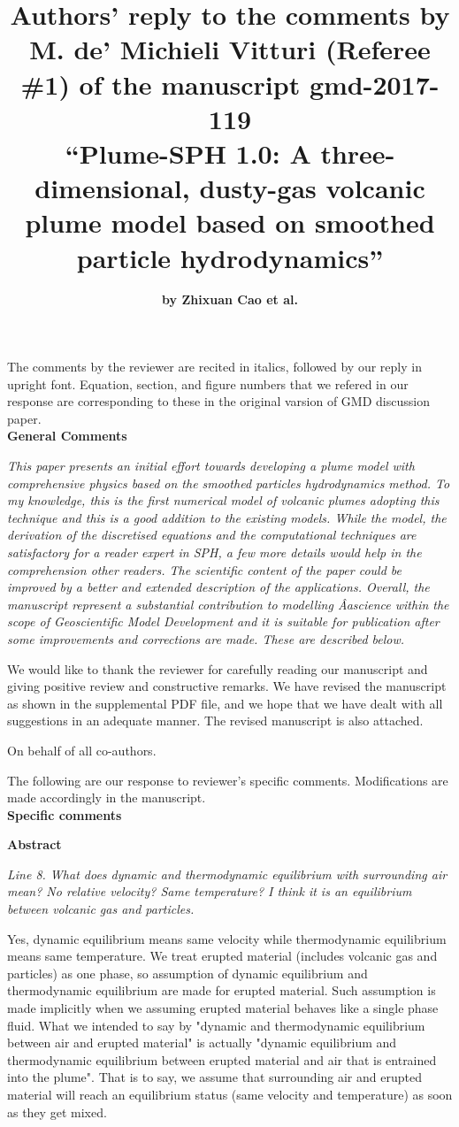 \documentclass[10pt,a4paper]{article}
\author{\Large \textbf{by Zhixuan Cao et al.}}
\title{ \Large{ Authors' reply to the comments by M. de’ Michieli Vitturi (Referee \#1) of the manuscript gmd-2017-119} \\
\LARGE \textbf{“Plume-SPH 1.0: A three-dimensional, dusty-gas volcanic plume model based on smoothed particle hydrodynamics”}}
\date{\vspace{-5ex}}
\begin{document}
\maketitle
The comments by the reviewer are recited in italics, followed by our reply in upright font. Equation, section, and figure numbers that we refered in our response are corresponding to these in the original varsion of GMD discussion paper. \\[12pt]

\textbf{\large General Comments}

\textit{This paper presents an initial effort towards developing a plume model with comprehensive physics based on the smoothed particles hydrodynamics method. To my knowledge, this is the first numerical model of volcanic plumes adopting this technique and this is a good addition to the existing models. While the model, the derivation of the discretised equations and the computational techniques are satisfactory for a reader expert in SPH, a few more details would help in the comprehension other readers. The scientific content of the paper could be improved by a better and extended description of the applications. Overall, the manuscript represent a substantial contribution to modelling Âascience within the scope of Geoscientific Model Development and it is suitable for publication after some improvements and corrections are made. These are described below.} 

We would like to thank the reviewer for carefully reading our manuscript and giving positive review and constructive remarks.
We have revised the manuscript as shown in the supplemental PDF file, and we hope that we have dealt with all suggestions in an adequate manner. The revised manuscript is also attached.
 
On behalf of all co-authors.

The following are our response to reviewer's specific comments. Modifications are made accordingly in the manuscript. \\[12pt]

\textbf{\large Specific comments}

\textbf{Abstract}

\textit{Line 8. What does dynamic and thermodynamic equilibrium with surrounding air mean? No relative velocity? Same temperature? I think it is an equilibrium between volcanic gas and particles.}

Yes, dynamic equilibrium means same velocity while thermodynamic equilibrium means same temperature. We treat erupted material (includes volcanic gas and particles) as one phase, so assumption of dynamic equilibrium and thermodynamic equilibrium are made for erupted material. Such assumption is made implicitly when we assuming erupted material behaves like a single phase fluid.
What we intended to say by "dynamic and thermodynamic equilibrium between air and erupted material" is actually "dynamic equilibrium and thermodynamic equilibrium between erupted material and air that is entrained into the plume". That is to say, we assume that surrounding air and erupted material will reach an equilibrium status (same velocity and temperature) as soon as they get mixed.
 
\end{document}
